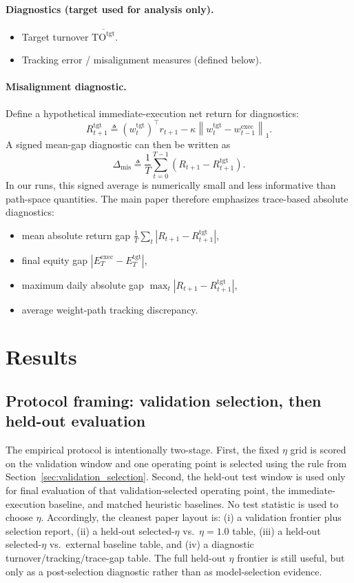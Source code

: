 \documentclass[10pt,twocolumn]{article}
\newcommand{\wexec}{w^{\mathrm{exec}}}
\newcommand{\wtgt}{w^{\mathrm{tgt}}}
\newcommand{\TOtgt}{\mathrm{TO}^{\mathrm{tgt}}}
\newcommand{\kappaTC}{\kappa}
\newcommand{\normone}[1]{\left\lVert #1 \right\rVert_1}
\begin{document}
\paragraph{Diagnostics (target used for analysis only).}
\begin{itemize}[leftmargin=*,itemsep=1pt]
\item Target turnover $\overline{\TOtgt}$.
\item Tracking error / misalignment measures (defined below).
\end{itemize}

\paragraph{Misalignment diagnostic.}
Define a hypothetical immediate-execution net return for diagnostics:
\[
R^{\mathrm{tgt}}_{t+1} \triangleq (\wtgt_t)^\top r_{t+1} - \kappaTC \normone{\wtgt_t-\wexec_{t-1}}.
\]
A signed mean-gap diagnostic can then be written as
\[
\Delta_{\mathrm{mis}} \triangleq \frac{1}{T}\sum_{t=0}^{T-1}\left(R_{t+1} - R^{\mathrm{tgt}}_{t+1}\right).
\]
In our runs, this signed average is numerically small and less informative than path-space quantities. The main paper therefore emphasizes trace-based absolute diagnostics:
\begin{itemize}[leftmargin=*,itemsep=1pt]
\item mean absolute return gap $\frac{1}{T}\sum_t |R_{t+1}-R^{\mathrm{tgt}}_{t+1}|$,
\item final equity gap $|E_T^{\mathrm{exec}}-E_T^{\mathrm{tgt}}|$,
\item maximum daily absolute gap $\max_t |R_{t+1}-R^{\mathrm{tgt}}_{t+1}|$,
\item average weight-path tracking discrepancy.
\end{itemize}

\section{Results}
\label{sec:results}

\subsection{Protocol framing: validation selection, then held-out evaluation}
The empirical protocol is intentionally two-stage. First, the fixed $\eta$ grid is scored on the validation window and one operating point is selected using the rule from Section~\ref{sec:validation_selection}. Second, the held-out test window is used only for final evaluation of that validation-selected operating point, the immediate-execution baseline, and matched heuristic baselines. No test statistic is used to choose $\eta$. Accordingly, the cleanest paper layout is: (i) a validation frontier plus selection report, (ii) a held-out selected-$\eta$ vs.\ $\eta=1.0$ table, (iii) a held-out selected-$\eta$ vs.\ external baseline table, and (iv) a diagnostic turnover/tracking/trace-gap table. The full held-out $\eta$ frontier is still useful, but only as a post-selection diagnostic rather than as model-selection evidence.
\end{document}
